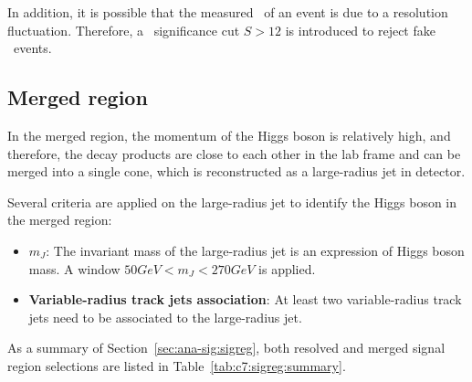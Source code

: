\par In addition, it is possible that the measured \met~of an event is due to a resolution fluctuation. Therefore, a \met~significance cut $S>12$ is introduced to reject fake \met~events.

\subsection{Merged region}

\par In the merged region, the momentum of the Higgs boson is relatively high, and therefore, the decay products are close to each other in the lab frame and can be merged into a single cone, which is reconstructed as a large-radius jet in detector.
\par Several criteria are applied on the large-radius jet to identify the Higgs boson in the merged region:
\begin{itemize}
    \item \textbf{$m_{J}$}: The invariant mass of the large-radius jet is an expression of Higgs boson mass. A window $50GeV<m_{J}<270GeV$ is applied.
    \item \textbf{Variable-radius track jets association}: At least two variable-radius track jets need to be associated to the large-radius jet.
\end{itemize}

\par As a summary of Section~\ref{sec:ana-sig:sigreg}, both resolved and merged signal region selections are listed in Table~\ref{tab:c7:sigreg:summary}.

